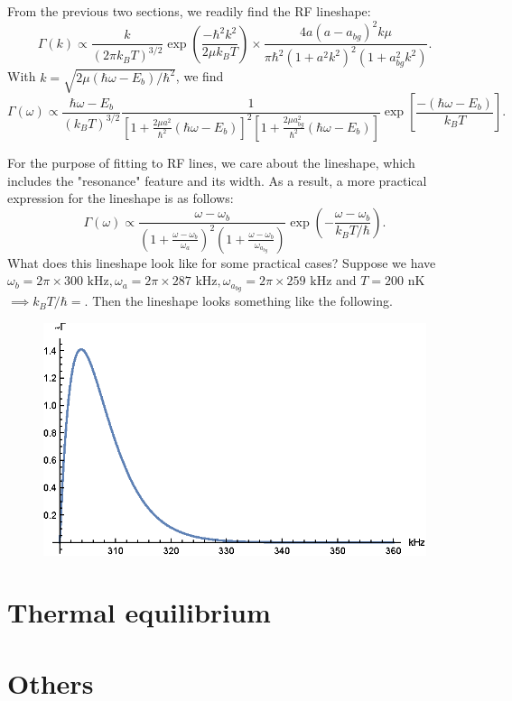 \documentclass{article}
\theoremstyle{definition}
\newcommand{\f}[2]{\frac{#1}{#2}}
\newcommand{\lp}{\left(}
\newcommand{\rp}{\right)}
\newcommand{\lb}{\left[}
\newcommand{\rb}{\right]}
\begin{document}
From the previous two sections, we readily find the RF lineshape:
\begin{equation}
\Gamma(k) \propto \f{k}{(2\pi k_B T)^{3/2}} \exp \lp \f{-\hbar^2 k^2 }{2 \mu k_B T} \rp \times \f{4 a (a - a_{bg})^2 k \mu }{\pi \hbar^2 (1 + a^2 k^2 )^2  (1 + a^2_{bg} k^2 )}.
\end{equation}
With $k = \sqrt{2\mu (\hbar \omega - E_b) / \hbar^2 }$, we find 
\begin{equation}
\Gamma(\omega) \propto \f{\hbar \omega - E_b}{(k_BT)^{3/2}}  \f{1 }{\lb 1 + \f{2\mu a^2}{\hbar^2} (\hbar \omega - E_b) \rb^2  \lb 1 + \f{2\mu a_{bg}^2}{\hbar^2}  (\hbar \omega - E_b) \rb} \exp\lb \f{-(\hbar \omega - E_b)}{k_B T} \rb.
\end{equation}

For the purpose of fitting to RF lines, we care about the lineshape, which includes the "resonance" feature and its width. As a result, a more practical expression for the lineshape is as follows:
\begin{equation}
\Gamma(\omega) \propto 
\f{\omega - \omega_b}{\lp 1 + \f{\omega - \omega_b}{ \omega_a} \rp^2 \lp 1 + \f{\omega - \omega_b}{\omega_{a_{bg}}} \rp} 
\exp\lp -\f{\omega - \omega_b}{k_B T / \hbar } \rp. 
\end{equation}
What does this lineshape look like for some practical cases? Suppose we have $\omega_b = 2\pi \times 300 \text{ kHz}, \omega_a = 2\pi \times 287  \text{ kHz}, \omega_{a_{bg}} =  2\pi \times 259 \text{ kHz}$ and $T = 200$ nK $\implies k_BT / \hbar  = $. Then the lineshape looks something like the following.
\begin{figure}[!htb]
\centering
\includegraphics[scale = 1.0]{lineshape.eps}
\end{figure}


\section{Thermal equilibrium}


\section{Others}








 
	
\end{document}
